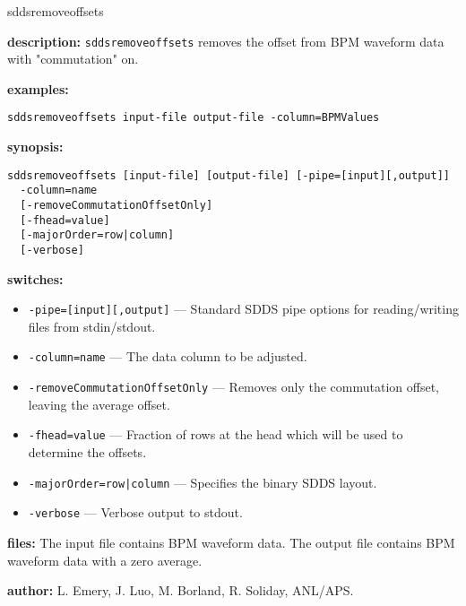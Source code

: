 \begin{sddsprog}{sddsremoveoffsets}
  \item \textbf{description:}
    \verb|sddsremoveoffsets| removes the offset from BPM waveform data with "commutation" on.
  \item \textbf{examples:}
  \begin{verbatim}
sddsremoveoffsets input-file output-file -column=BPMValues
  \end{verbatim}
  \item \textbf{synopsis:}
  \begin{verbatim}
sddsremoveoffsets [input-file] [output-file] [-pipe=[input][,output]]
  -column=name
  [-removeCommutationOffsetOnly]
  [-fhead=value]
  [-majorOrder=row|column]
  [-verbose]
  \end{verbatim}
  \item \textbf{switches:}
    \begin{itemize}
      \item \verb|-pipe=[input][,output]| --- Standard SDDS pipe options for reading/writing files from stdin/stdout.
      \item \verb|-column=name| --- The data column to be adjusted.
      \item \verb|-removeCommutationOffsetOnly| --- Removes only the commutation offset, leaving the average offset.
      \item \verb|-fhead=value| --- Fraction of rows at the head which will be used to determine the offsets.
      \item \verb!-majorOrder=row|column! --- Specifies the binary SDDS layout.
      \item \verb|-verbose| --- Verbose output to stdout.
    \end{itemize}
  \item \textbf{files:}
    The input file contains BPM waveform data. The output file contains BPM waveform data with a zero average.
  \item \textbf{author:} L. Emery, J. Luo, M. Borland, R. Soliday, ANL/APS.
\end{sddsprog}

